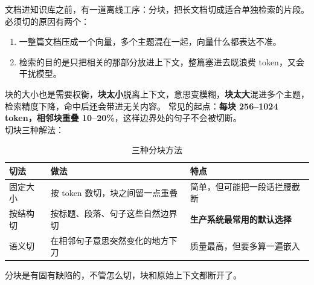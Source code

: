 文档进知识库之前，有一道离线工序：分块，把长文档切成适合单独检索的片段。必须切的原因有两个：
\begin{enumerate}
    \item 一整篇文档压成一个向量，多个主题混在一起，向量什么都表达不准。
    \item 检索的目的是只把相关的那部分放进上下文，整篇塞进去既浪费 token，又会干扰模型。
\end{enumerate}
块的大小也是需要权衡，\textbf{块太小}脱离上下文，意思变模糊，\textbf{块太大}混进多个主题，检索精度下降，命中后还会带进无关内容。
常见的起点：\textbf{每块 256–1024 token，相邻块重叠 10–20\%}，这样边界处的句子不会被切断。\\

切块三种解法：
\begin{table}[htbp]
\centering
\caption{三种分块方法}
\label{tab:chunking}
\begin{tabular}{p{2.5cm} p{6.5cm} p{6cm}}
  \toprule
  切法 & 做法 & 特点 \\
  \midrule
  固定大小 & 按 token 数切，块之间留一点重叠 & 简单，但可能把一段话拦腰截断 \\
  按结构切 & 按标题、段落、句子这些自然边界切 & \textbf{生产系统最常用的默认选择} \\
  语义切   & 在相邻句子意思突然变化的地方下刀 & 质量最高，但要多算一遍嵌入 \\
  \bottomrule
\end{tabular}
\end{table}
分块是有固有缺陷的，不管怎么切，块和原始上下文都断开了。
